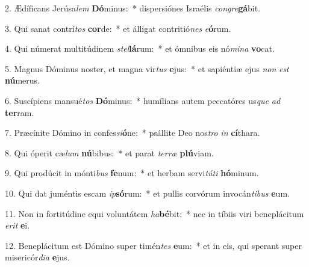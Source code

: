 2. Ædíficans Jerúsa\textit{lem} \textbf{Dó}minus:~*  dispersiónes Israélis \textit{con}\textit{gre}\textbf{gá}bit.\

3. Qui sanat contrí\textit{tos} \textbf{cor}de:~*  et álligat contritió\textit{nes} \textit{e}\textbf{ó}rum.\

4. Qui númerat multitúdinem \textit{stel}\textbf{lá}rum:~*  et ómnibus eis nó\textit{mi}\textit{na} \textbf{vo}cat.\

5. Magnus Dóminus noster, et magna vir\textit{tus} \textbf{e}jus:~*  et sapiéntiæ ejus \textit{non} \textit{est} \textbf{nú}merus.\

6. Suscípiens mansué\textit{tos} \textbf{Dó}minus:~*  humílians autem peccatóres us\textit{que} \textit{ad} \textbf{ter}ram.\

7. Præcínite Dómino in confes\textit{si}\textbf{ó}ne:~*  psállite Deo nos\textit{tro} \textit{in} \textbf{cí}thara.\

8. Qui óperit cæ\textit{lum} \textbf{nú}bibus:~*  et parat \textit{ter}\textit{ræ} \textbf{plú}viam.\

9. Qui prodúcit in mónti\textit{bus} \textbf{fe}num:~*  et herbam servi\textit{tú}\textit{ti} \textbf{hó}minum.\

10. Qui dat juméntis escam \textit{ip}\textbf{só}rum:~*  et pullis corvórum invocán\textit{ti}\textit{bus} \textbf{e}um.\

11. Non in fortitúdine equi voluntátem \textit{ha}\textbf{bé}bit:~*  nec in tíbiis viri beneplácitum \textit{e}\textit{rit} \textbf{e}i.\

12. Beneplácitum est Dómino super timén\textit{tes} \textbf{e}um:~*  et in eis, qui sperant super misericór\textit{di}\textit{a} \textbf{e}jus.\

